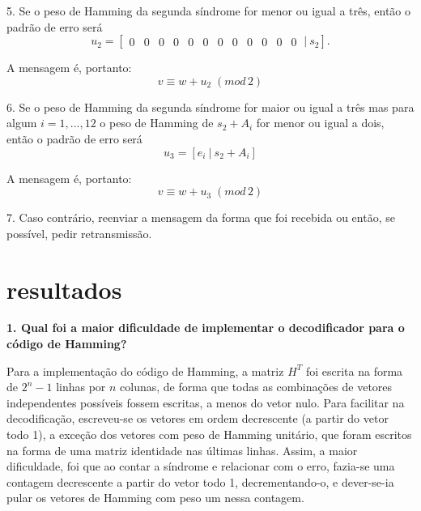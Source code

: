\documentclass[%
aip,
jmp,%
amsmath,amssymb,
reprint,%
]{revtex4-1}
\begin{document}
	5. Se o peso de Hamming da segunda síndrome for menor ou igual a três, então o padrão de erro será
	\begin{equation}
		u_2 = \left[\begin{array}{cccccccccccc}
		0&0&0&0&0&0&0&0&0&0&0&0
		\end{array}\:|\:s_{2}\right].
	\end{equation}
	
	A mensagem é, portanto:
	\begin{equation}
	v \equiv w+u_2\; (mod\, 2)
	\end{equation}
	
	6. Se o peso de Hamming da segunda síndrome for maior ou igual a três mas para algum $i=1,...,12$ o peso de Hamming de $s_{2}+A_{i}$ for menor ou igual a dois, então o padrão de erro será
	\begin{equation}
	u_3=\left[e_{i}\:|\:s_{2}+A_{i}\right]
	\end{equation}
	
	A mensagem é, portanto:
	\begin{equation}
	v \equiv w+u_3\; (mod\, 2)
	\end{equation}
	
	7. Caso contrário, reenviar a mensagem da forma que foi recebida ou então, se possível, pedir retransmissão.
	
	\section{resultados\label{sec:resultados}}
	
	\textbf{1. Qual foi a maior dificuldade de implementar o decodificador para o código de Hamming?}\newline
	
	Para a implementação do código de Hamming, a matriz $H^T$ foi escrita na forma de $2^n-1$ linhas por $n$ colunas, de forma que todas as combinações de vetores independentes possíveis fossem escritas, a menos do vetor nulo. Para facilitar na decodificação, escreveu-se os vetores em ordem decrescente (a partir do vetor todo 1), a exceção dos vetores com peso de Hamming unitário, que foram escritos na forma de uma matriz identidade nas últimas linhas.
	Assim, a maior dificuldade, foi que ao contar a síndrome e relacionar com o erro, fazia-se uma contagem decrescente a partir do vetor todo 1, decrementando-o, e dever-se-ia pular os vetores de Hamming com peso um nessa contagem.
	\newline
	
\end{document}
